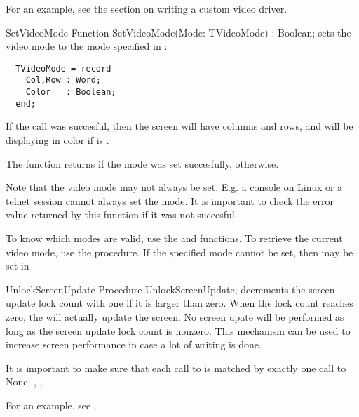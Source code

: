 For an example, see the section on writing a custom video driver.

\begin{function}{SetVideoMode}
\Declaration
Function SetVideoMode(Mode: TVideoMode) : Boolean;
\Description
{} sets the video mode to the mode specified in :
\begin{verbatim}
  TVideoMode = record
    Col,Row : Word;
    Color   : Boolean;
  end;
\end{verbatim}
If the call was succesful, then the screen will have  columns and
 rows, and will be displaying in color if  is
. 

The function returns  if the mode was set succesfully, 
otherwise.

Note that the video mode may not always be set. E.g. a console on Linux
or a telnet session cannot always set the mode. It is important to check
the error value returned by this function if it was not succesful.

To know which modes are valid, use the  and
 functions. To retrieve the current video mode, 
use the  procedure.
\Errors
If the specified mode cannot be set, then  may be set
in 
\SeeAlso
{}
\end{function}

\begin{procedure}{UnlockScreenUpdate}
\Declaration
Procedure UnlockScreenUpdate;
\Description
{} decrements the screen update lock count with one if
it is larger than zero. When the lock count reaches zero, the 
 will actually update the screen. No screen upate will 
be performed as long as the screen update lock count is nonzero. This 
mechanism can be used to increase screen performance in case a lot of 
writing is done. 

It is important to make sure that each call to  is
matched by exactly one call to 
\Errors
None.
\SeeAlso
{}, , 
\end{procedure}

For an example, see .

